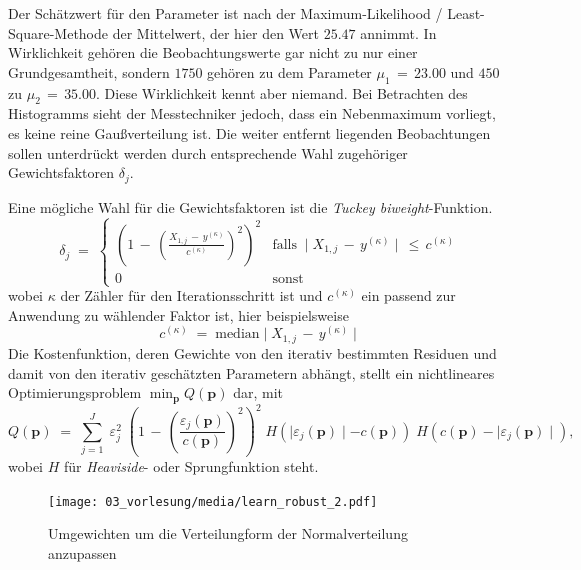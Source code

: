 Der Schätzwert für den Parameter ist nach der Maximum-Likelihood / Least-Square-Methode der
Mittelwert, der hier den Wert $25.47$ annimmt. In Wirklichkeit gehören die Beobachtungswerte gar nicht zu
nur einer Grundgesamtheit, sondern $1750$ gehören zu dem Parameter $\mu_1 \, = \, 23.00$ und $450$ zu $\mu_2 \, = \, 35.00$.
Diese Wirklichkeit kennt aber niemand. Bei Betrachten des Histogramms sieht der Messtechniker jedoch, dass ein
Nebenmaximum vorliegt, es keine reine Gaußverteilung ist. Die weiter entfernt liegenden Beobachtungen sollen unterdrückt werden
durch entsprechende Wahl zugehöriger Gewichtsfaktoren $\delta_j$.

Eine mögliche Wahl für die Gewichtsfaktoren ist die \textsl{Tuckey biweight}-Funktion.
\begin{equation}
\delta_j \; = \;
\left\{ \begin{array}{cl}
\left( 1 \, - \, \left( \frac{X_{1,j} \, - \, y^{(\kappa)}}{c^{(\kappa)}} \right)^2 \right)^2 &
	\mathrm{falls} \; \mid X_{1,j} \, - \, y^{(\kappa)} \mid \, \leq \, c^{(\kappa)} \\
0 & \mathrm{sonst}
\end{array} \right.
\end{equation}
wobei $\kappa$ der Zähler für den Iterationsschritt ist und $c^{(\kappa)}$ ein passend zur Anwendung zu wählender Faktor ist, hier beispielsweise
\begin{equation}
c^{(\kappa)} \; = \; \mathrm{median} \mid X_{1,j} \, - \, y^{(\kappa)} \mid
\end{equation}
Die Kostenfunktion, deren Gewichte von den iterativ bestimmten Residuen und damit von den
iterativ geschätzten Parametern abhängt, stellt ein nichtlineares Optimierungsproblem
$ \min_{\mathbf{p}} Q(\mathbf{p}) $ dar, mit
\begin{equation}
Q(\mathbf{p}) \; = \; \sum_{j=1}^J \; \varepsilon_j^2 \;
\left( 1 \, - \, \left( \frac{\varepsilon_j(\mathbf{p}) }{c(\mathbf{p})} \right)^2 \right)^2 \;
H(\mid \varepsilon_j(\mathbf{p}) \mid - c(\mathbf{p})) \;
H(c(\mathbf{p}) - \mid \varepsilon_j(\mathbf{p}) \mid ),
\label{robustEstim2}
\end{equation}
wobei $H$ für \textsl{Heaviside}- oder Sprungfunktion steht.

\begin{figure}
\begin{center}
\texttt{[image: 03\_vorlesung/media/learn\_robust\_2.pdf]}
\caption{\label{RobustIter} Umgewichten um die Verteilungform der Normalverteilung anzupassen}
\end{center}
\end{figure}

